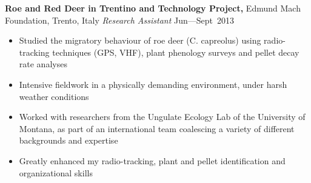 
\vspace{5pt}

\textbf{Roe and Red Deer in Trentino and Technology Project,} Edmund Mach Foundation, Trento, Italy\newline
\emph{Research Assistant} \hfill{Jun--–Sept~2013}
\begin{itemize}
  \item Studied the migratory behaviour of roe deer (C. capreolus) using radio-tracking techniques (GPS, VHF), plant phenology surveys and pellet decay rate analyses
  \item Intensive fieldwork in a physically demanding environment, under harsh weather conditions
  \item Worked with researchers from the Ungulate Ecology Lab of the University of Montana, as part of an international team coalescing a variety of different backgrounds and expertise
  \item Greatly enhanced my radio-tracking, plant and pellet identification and organizational skills
\end{itemize}
